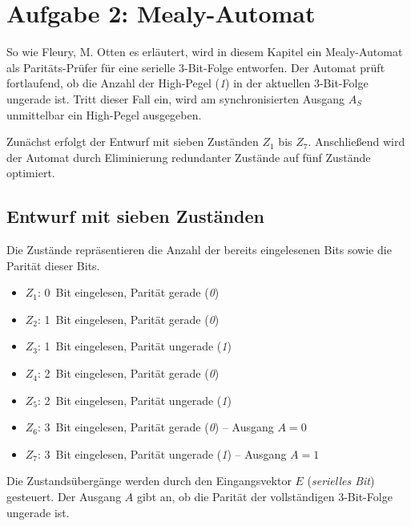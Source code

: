 

\section{Aufgabe 2: Mealy-Automat}
So wie Fleury, M. Otten \cite{2} es erläutert, wird in diesem Kapitel ein Mealy-Automat als Paritäts-Prüfer für eine serielle 3-Bit-Folge entworfen. 
Der Automat prüft fortlaufend, ob die Anzahl der High-Pegel (\textit{1}) in der aktuellen 3-Bit-Folge ungerade ist. 
Tritt dieser Fall ein, wird am synchronisierten Ausgang \( A_S \) unmittelbar ein High-Pegel ausgegeben.

Zunächst erfolgt der Entwurf mit sieben Zuständen \( Z_1 \) bis \( Z_7 \). 
Anschließend wird der Automat durch Eliminierung redundanter Zustände auf fünf Zustände optimiert.

\subsection{Entwurf mit sieben Zuständen}
Die Zustände repräsentieren die Anzahl der bereits eingelesenen Bits sowie die Parität dieser Bits.
\begin{itemize}
    \item \( Z_1 \): 0 Bit eingelesen, Parität gerade (\textit{0})
    \item \( Z_2 \): 1 Bit eingelesen, Parität gerade (\textit{0})
    \item \( Z_3 \): 1 Bit eingelesen, Parität ungerade (\textit{1})
    \item \( Z_4 \): 2 Bit eingelesen, Parität gerade (\textit{0})
    \item \( Z_5 \): 2 Bit eingelesen, Parität ungerade (\textit{1})
    \item \( Z_6 \): 3 Bit eingelesen, Parität gerade (\textit{0}) – Ausgang \( A = 0 \)
    \item \( Z_7 \): 3 Bit eingelesen, Parität ungerade (\textit{1}) – Ausgang \( A = 1 \)
\end{itemize}
Die Zustandsübergänge werden durch den Eingangsvektor \( E \) (\textit{serielles Bit}) gesteuert. 
Der Ausgang \( A \) gibt an, ob die Parität der vollständigen 3-Bit-Folge ungerade ist.
